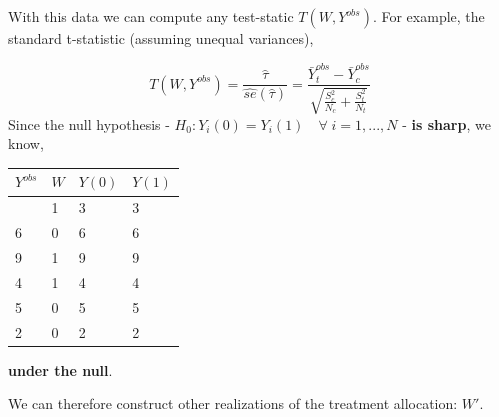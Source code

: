 \documentclass[
  letterpaper,
  DIV=11,
  numbers=noendperiod]{scrreprt}
\theoremstyle{definition}
\theoremstyle{remark}
\begin{document}
With this data we can compute any test-static \(T(W,Y^{obs})\). For
example, the standard t-statistic (assuming unequal variances),

\[
T(W,Y^{obs}) = \frac{\hat{\tau}}{\hat{se}(\hat{\tau})} = \frac{\bar{Y}^{obs}_t-\bar{Y}^{obs}_c}{\sqrt{\frac{S^2_c}{N_c}+\frac{S^2_t}{N_t}}}
\] Since the null hypothesis -
\(H_0: Y_i(0)=Y_i(1) \quad\forall\; i=1,...,N\) - \textbf{is sharp}, we
know,

\begin{longtable}[]{@{}llll@{}}
\toprule\noalign{}
\(Y^{obs}\) & \(W\) & \(Y(0)\) & \(Y(1)\) \\
\midrule\noalign{}
\endhead
\bottomrule\noalign{}
\endlastfoot
3 & 1 & {3} & 3 \\
6 & 0 & 6 & {6} \\
9 & 1 & {9} & 9 \\
4 & 1 & {4} & 4 \\
5 & 0 & 5 & {5} \\
2 & 0 & 2 & {2} \\
\end{longtable}

\textbf{under the null}.

We can therefore construct other realizations of the treatment
allocation: \(W'\).
\end{document}
